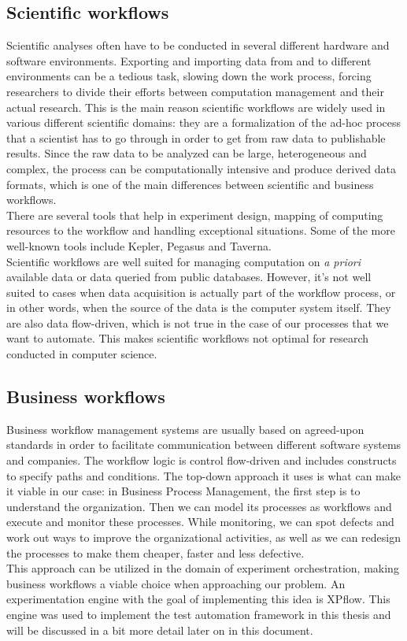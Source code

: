 \subsection{Scientific workflows}
Scientific analyses often have to be conducted in several different
hardware and software environments. Exporting and importing data from
and to different environments can be a tedious task, slowing down the
work process, forcing researchers to divide their efforts between
computation management and their actual research. This is the main
reason scientific workflows are widely used in various different
scientific domains: they are a formalization of the ad-hoc
process that a scientist has to go through in order to get from raw
data to publishable results. Since the raw data to be analyzed can be
large, heterogeneous and complex, the process can be computationally
intensive and produce derived data formats, which is one of the main
differences between scientific and business
workflows.\cite{abjjlm04}\\
There are several tools that help in experiment design, mapping of
computing resources to the workflow and handling exceptional
situations. Some of the more well-known tools include
Kepler\cite{abjjlm04}, Pegasus\cite{dssbgkmvbgljk05} and
Taverna\cite{whfwwsdnfbbbhnvsg13}.\\
Scientific workflows are well suited for managing computation on
\emph{a priori} available data or data queried from public
databases. However, it's not well suited to cases when data
acquisition is actually part of the workflow process, or in other
words, when the source of the data is the computer system
itself. They are also data flow-driven, which is not true in the case
of our processes that we want to automate. This makes scientific
workflows not optimal for research conducted in computer science.
\subsection{Business workflows}
Business workflow management systems are usually based on agreed-upon
standards in order to facilitate communication between different
software systems and companies. The workflow logic is control
flow-driven and includes constructs to specify paths and
conditions.\cite{skd10} The top-down approach it uses is what can make
it viable in our case: in Business Process Management, the first step
is to understand the organization. Then we can model its processes as
workflows and execute and monitor these processes. While monitoring,
we can spot defects and work out ways to improve the organizational
activities, as well as we can redesign the processes to make them
cheaper, faster and less defective.\cite{bn12_2}\\
This approach can be utilized in the domain of experiment
orchestration, making business workflows a viable choice when
approaching our problem. An experimentation engine with the goal of
implementing this idea is XPflow\cite{bn12_2}. This engine was used to
implement the test automation framework in this thesis and will be
discussed in a bit more detail later on in this document.
